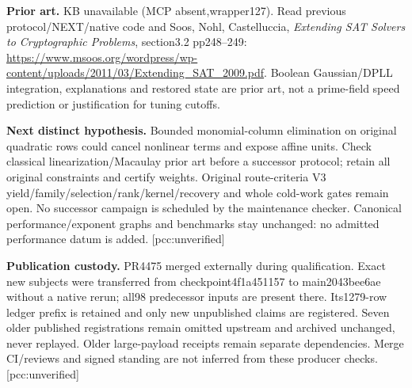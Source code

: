 \documentclass[10pt]{article}
\begin{document}
\textbf{Prior art.} KB unavailable (MCP absent,wrapper127). Read previous
protocol/NEXT/native code and Soos, Nohl, Castelluccia,
\emph{Extending SAT Solvers to Cryptographic Problems}, section3.2 pp248--249:
\url{https://www.msoos.org/wordpress/wp-content/uploads/2011/03/Extending_SAT_2009.pdf}.
Boolean Gaussian/DPLL integration, explanations and restored state are prior
art, not a prime-field speed prediction or justification for tuning cutoffs.

\textbf{Next distinct hypothesis.} Bounded monomial-column elimination on
original quadratic rows could cancel nonlinear terms and expose affine units.
Check classical linearization/Macaulay prior art before a successor protocol;
retain all original constraints and certify weights. Original route-criteria
V3 yield/family/selection/rank/kernel/recovery and whole cold-work gates remain
open. No successor campaign is scheduled by the maintenance checker.
Canonical performance/exponent graphs and benchmarks stay unchanged: no
admitted performance datum is added. [pcc:unverified]

\textbf{Publication custody.} PR4475 merged externally during qualification.
Exact new subjects were transferred from checkpoint4f1a451157 to main2043bee6ae
without a native rerun; all98 predecessor inputs are present there. Its1279-row
ledger prefix is retained and only new unpublished claims are registered.
Seven older published registrations remain omitted upstream and archived
unchanged, never replayed. Older large-payload receipts remain separate
dependencies. Merge CI/reviews and signed standing are not inferred from
these producer checks. [pcc:unverified]
\end{document}
